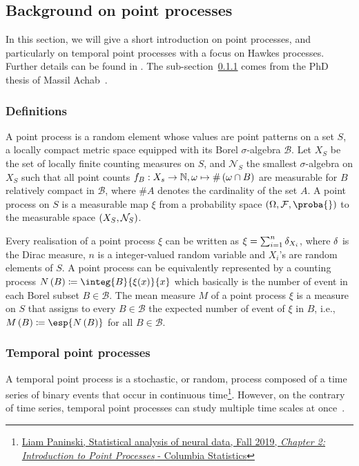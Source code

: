 \subsection{Background on point processes}\label{background_tpp}

In this section, we will give a short introduction on point processes, and particularly on temporal point processes with a focus on Hawkes processes.
Further details can be found in \citep{daley2003introduction, daley2007introduction}.
The sub-section~\ref{pp_definitions} comes from the PhD thesis of Massil Achab~\citep{achab2017learning}.

\subsubsection{Definitions}\label{pp_definitions}
A point process is a random element whose values are point patterns on a set $S$, a locally compact metric space equipped with its Borel $\sigma$-algebra $\mathscr{B}$.
Let $X_S$ be the set of locally finite counting measures on $S$, and $\mathcal{N}_S$ the smallest $\sigma$-algebra on $X_S$ such that all point counts ${f_B: X_s \to \mathbb{N}, \omega \mapsto \#\left( \omega \cap B \right)}$ are measurable for $B$ relatively compact in $\mathscr{B}$, where $\# A$ denotes the cardinality of the set $A$.
A point process on $S$ is a measurable map $\xi$ from a probability space $\pars{\Omega, \mathcal{F}, \proba{}}$ to the measurable space $\left( X_S, \mathcal{N}_S \right)$.

Every realisation of a point process $\xi$ can be written as $\xi = \sum_{i=1}^n \mathrm{\delta}_{X_i}$, where $\mathrm{\delta}$ is the Dirac measure, $n$ is a integer-valued random variable and $X_i$'s are random elements of $S$.
A point process can be equivalently represented by a counting process $N\pars{B} \coloneqq \integ{B}{\xi (x)}{x}$ which basically is the number of event in each Borel subset $B\in\mathscr{B}$.
The mean measure $M$ of a point process $\xi$ is a measure on $S$ that assigns to every $B\in\mathscr{B}$ the expected number of event of $\xi$ in $B$, i.e., $M\pars{B} \coloneqq \esp{N\pars{B}}$ for all $B\in\mathscr{B}$.


\subsubsection{Temporal point processes}
A temporal point process is a stochastic, or random, process composed of a time series of binary events that occur in continuous time\footnote{\href{http://www.stat.columbia.edu/~liam/teaching/neurostat-fall19/uri-eden-point-process-notes.pdf}{Liam Paninski, Statistical analysis of neural data, Fall 2019, \textit{Chapter 2: Introduction to Point Processes} - Columbia Statistics}}.
However, on the contrary of time series, temporal point processes can study multiple time scales at once~\citep{bompaire2019machine}. 

